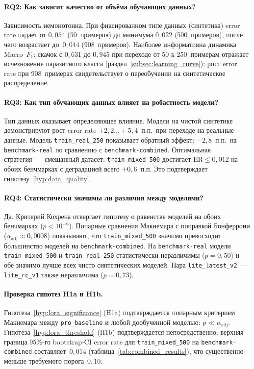 \paragraph{\textsc{RQ2}: Как зависит качество от объёма обучающих данных?}

Зависимость немонотонна. При фиксированном типе данных (синтетика) error rate падает от $0{,}054$ (50~примеров) до минимума $0{,}022$ (500~примеров), после чего возрастает до~$0{,}044$ (908~примеров). Наиболее информативна динамика Macro~$F_1$: скачок с $0{,}631$ до $0{,}945$ при переходе от 50 к 250~примерам отражает исчезновение паразитного класса (раздел~\ref{subsec:learning_curve}); рост error rate при 908~примерах свидетельствует о переобучении на синтетическое распределение.

\paragraph{\textsc{RQ3}: Как тип обучающих данных влияет на робастность модели?}

Тип данных оказывает определяющее влияние. Модели на чистой синтетике демонстрируют рост error rate $+2{,}2\ldots +5{,}4$~п.п.\ при переходе на реальные данные. Модель \texttt{train\_real\_250} показывает обратный эффект: $-2{,}8$~п.п.\ на \texttt{benchmark-real} по сравнению с \texttt{benchmark-combined}. Оптимальная стратегия~--- смешанный датасет: \texttt{train\_mixed\_500} достигает $\mathrm{ER} \leqslant 0{,}012$ на обоих бенчмарках с деградацией всего $+0{,}6$~п.п. Это подтверждает гипотезу~\ref{hyp:data_quality}.

\paragraph{\textsc{RQ4}: Статистически значимы ли различия между моделями?}

Да. Критерий Кохрена отвергает гипотезу о равенстве моделей на обоих бенчмарках ($p < 10^{-6}$). Попарные сравнения Макнемара с поправкой Бонферрони ($\alpha_{\mathrm{adj}} \approx 0{,}0008$) показывают, что \texttt{train\_mixed\_500} значимо превосходит большинство моделей на \texttt{benchmark-combined}. На \texttt{benchmark-real} модели \texttt{train\_mixed\_500} и \texttt{train\_real\_250} статистически неразличимы ($p = 0{,}50$) и обе значимо лучше всех чисто синтетических моделей. Пара \texttt{lite\_latest\_v2}~--- \texttt{lite\_rc\_v1} также неразличима ($p = 0{,}73$).

\paragraph{Проверка гипотез H1a и H1b.} Гипотеза~\ref{hyp:lora_significance} (H1a) подтверждается попарным критерием Макнемара между \texttt{pro\_baseline} и любой дообученной моделью: $p \ll \alpha_{\mathrm{adj}}$. Гипотеза~\ref{hyp:lora_threshold} (H1b) подтверждается непосредственно: верхняя граница 95\%-го bootstrap-CI error rate для \texttt{train\_mixed\_500} на \texttt{benchmark-combined} составляет~$0{,}014$ (таблица~\ref{tab:combined_results}), что существенно меньше требуемого порога~$0{,}10$.

\clearpage
